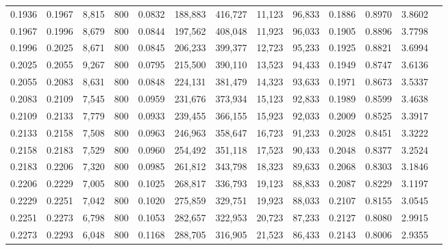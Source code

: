 \begin{tabular}{rrrrrrrrrrrrr}
0.1936 & 0.1967 &  8,815 &   800 &                                     0.0832 & 188,883 & 416,727 &  11,123 &  96,833 & 0.1886 & 0.8970 & 3.8602 \\
0.1967 & 0.1996 &  8,679 &   800 &                                     0.0844 & 197,562 & 408,048 &  11,923 &  96,033 & 0.1905 & 0.8896 & 3.7798 \\
0.1996 & 0.2025 &  8,671 &   800 &                                     0.0845 & 206,233 & 399,377 &  12,723 &  95,233 & 0.1925 & 0.8821 & 3.6994 \\
0.2025 & 0.2055 &  9,267 &   800 &                                     0.0795 & 215,500 & 390,110 &  13,523 &  94,433 & 0.1949 & 0.8747 & 3.6136 \\
0.2055 & 0.2083 &  8,631 &   800 &                                     0.0848 & 224,131 & 381,479 &  14,323 &  93,633 & 0.1971 & 0.8673 & 3.5337 \\
0.2083 & 0.2109 &  7,545 &   800 &                                     0.0959 & 231,676 & 373,934 &  15,123 &  92,833 & 0.1989 & 0.8599 & 3.4638 \\
0.2109 & 0.2133 &  7,779 &   800 &                                     0.0933 & 239,455 & 366,155 &  15,923 &  92,033 & 0.2009 & 0.8525 & 3.3917 \\
0.2133 & 0.2158 &  7,508 &   800 &                                     0.0963 & 246,963 & 358,647 &  16,723 &  91,233 & 0.2028 & 0.8451 & 3.3222 \\
0.2158 & 0.2183 &  7,529 &   800 &                                     0.0960 & 254,492 & 351,118 &  17,523 &  90,433 & 0.2048 & 0.8377 & 3.2524 \\
0.2183 & 0.2206 &  7,320 &   800 &                                     0.0985 & 261,812 & 343,798 &  18,323 &  89,633 & 0.2068 & 0.8303 & 3.1846 \\
0.2206 & 0.2229 &  7,005 &   800 &                                     0.1025 & 268,817 & 336,793 &  19,123 &  88,833 & 0.2087 & 0.8229 & 3.1197 \\
0.2229 & 0.2251 &  7,042 &   800 &                                     0.1020 & 275,859 & 329,751 &  19,923 &  88,033 & 0.2107 & 0.8155 & 3.0545 \\
0.2251 & 0.2273 &  6,798 &   800 &                                     0.1053 & 282,657 & 322,953 &  20,723 &  87,233 & 0.2127 & 0.8080 & 2.9915 \\
0.2273 & 0.2293 &  6,048 &   800 &                                     0.1168 & 288,705 & 316,905 &  21,523 &  86,433 & 0.2143 & 0.8006 & 2.9355 \\

\end{tabular}
